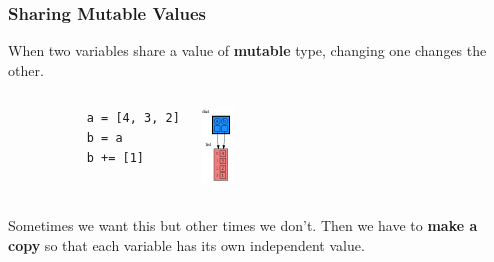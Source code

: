 \documentclass[10pt, colorlinks=true, urlcolor=blue]{beamer}
\begin{document}
\begin{frame}[fragile]
  \frametitle {Sharing Mutable Values}
  When two variables share a value of \textbf{mutable} type, changing one changes the other.
  \vspace{1em}
\begin{columns}
  \begin{verbatim}
           a = [4, 3, 2]
           b = a
           b += [1]
    \end{verbatim}
  \begin{center}\includegraphics[width=0.25\textwidth]{figures/sharing.png}\end{center}
\end{columns}
\vspace{1em}
Sometimes we want this but other times we don't. Then we have to \textbf{make a copy} so that each variable has its own independent value.
\end{frame}
\end{document}

